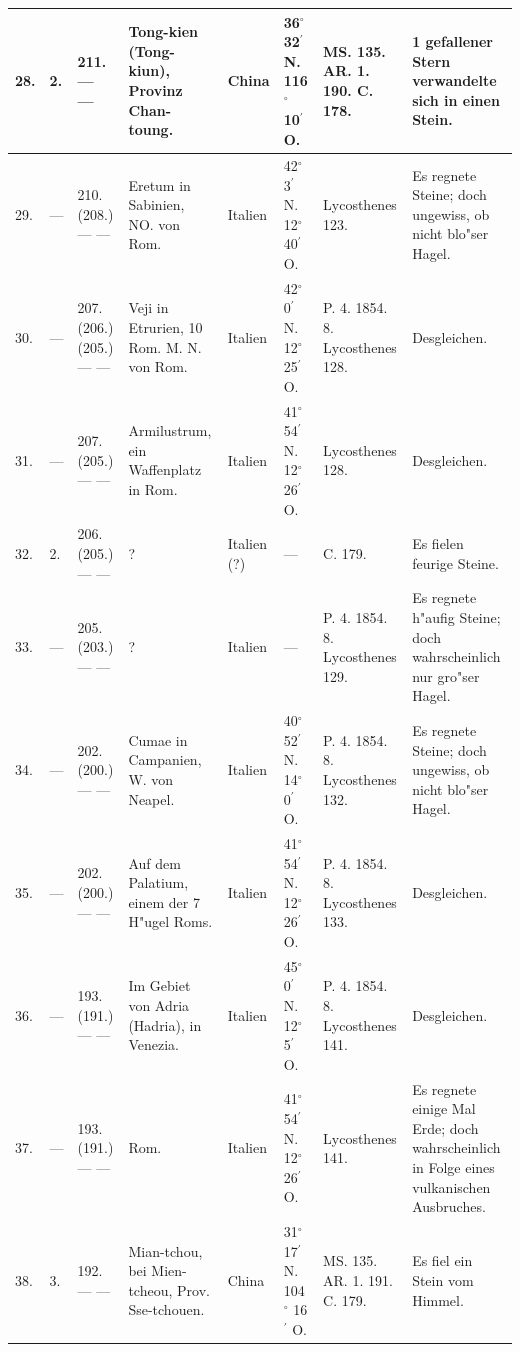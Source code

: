 \documentclass[a4paper, 8pt, oneside, polutonikogreek, german]{article}
\begin{document}
\begin{center}
\begin{longtable}{| p{5mm} | p{3mm} | p{15mm} | p{25mm} | p{20mm} | p{14mm} | p{17mm} | p{24mm} |}
        28. & 2. & 211. --- --- & Tong-kien (Tong-kiun), Provinz Chan-toung. & China & 36$^\circ$ 32$^\prime$ N. 116$^\circ$ 10$^\prime$ O. & MS. 135. AR. 1. 190. C. 178. & 1 gefallener Stern verwandelte sich in einen Stein. \\ \hline
        29. & --- & 210. (208.) --- --- & Eretum in Sabinien, NO. von Rom. & Italien & 42$^\circ$ 3$^\prime$ N. 12$^\circ$ 40$^\prime$ O. & Lycosthenes 123. & Es regnete Steine; doch ungewiss, ob nicht blo"ser Hagel. \\ \hline
        30. & --- & 207. (206.) (205.) --- --- & Veji in Etrurien, 10 Rom. M. N. von Rom. & Italien & 42$^\circ$ 0$^\prime$ N. 12$^\circ$ 25$^\prime$ O. & P. 4. 1854. 8. Lycosthenes 128. & Desgleichen. \\ \hline
        31. & --- & 207. (205.) --- --- & Armilustrum, ein Waffenplatz in Rom. & Italien & 41$^\circ$ 54$^\prime$ N. 12$^\circ$ 26$^\prime$ O. & Lycosthenes 128. & Desgleichen. \\ \hline
        32. & 2. & 206. (205.) --- --- & ? & Italien (?) & --- & C. 179. & Es fielen feurige Steine. \\ \hline
        33. & --- & 205. (203.) --- --- & ? & Italien & --- & P. 4. 1854. 8. Lycosthenes 129. & Es regnete h"aufig Steine; doch wahrscheinlich nur gro"ser Hagel. \\ \hline
        34. & --- & 202. (200.) --- --- & Cumae in Campanien, W. von Neapel. & Italien & 40$^\circ$ 52$^\prime$ N. 14$^\circ$ 0$^\prime$ O. & P. 4. 1854. 8. Lycosthenes 132. & Es regnete Steine; doch ungewiss, ob nicht blo"ser Hagel. \\ \hline
        35. & --- & 202. (200.) --- --- & Auf dem Palatium, einem der 7 H"ugel Roms. & Italien & 41$^\circ$ 54$^\prime$ N. 12$^\circ$ 26$^\prime$ O. & P. 4. 1854. 8. Lycosthenes 133. & Desgleichen. \\ \hline
        36. & --- & 193. (191.) --- --- & Im Gebiet von Adria (Hadria), in Venezia. & Italien & 45$^\circ$ 0$^\prime$ N. 12$^\circ$ 5$^\prime$ O. & P. 4. 1854. 8. Lycosthenes 141. & Desgleichen. \\ \hline
        37. & --- & 193. (191.) --- --- & Rom. & Italien & 41$^\circ$ 54$^\prime$ N. 12$^\circ$ 26$^\prime$ O. & Lycosthenes 141. & Es regnete einige Mal Erde; doch wahrscheinlich in Folge eines vulkanischen Ausbruches. \\ \hline
        38. & 3. & 192. --- --- & Mian-tchou, bei Mien-tcheou, Prov. Sse-tchouen. & China & 31$^\circ$ 17$^\prime$ N. 104$^\circ$ 16$^\prime$ O. & MS. 135. AR. 1. 191. C. 179. & Es fiel ein Stein vom Himmel. \\ \hline

\end{longtable}
\end{center}
\end{document}
